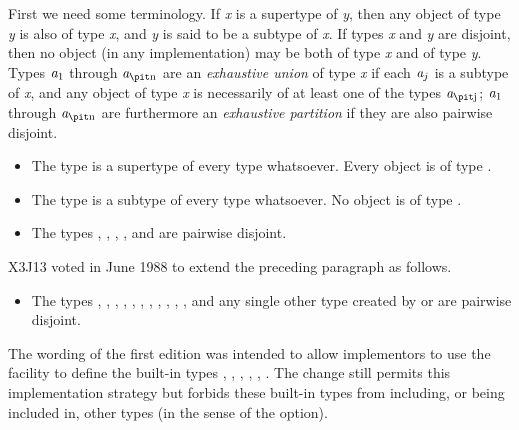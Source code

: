 First we need some terminology.
If \emph{x} is a supertype of \emph{y}, then any object of type \emph{y} is also
of type \emph{x}, and \emph{y} is said to be a subtype of \emph{x}.  If types
\emph{x} and \emph{y} are disjoint, then no object (in any implementation) may
be both of type \emph{x} and of type \emph{y}.  Types $\emph{a}_1$ through
$\emph{a}_{\hbox{\scriptsize\it n}}$ are an \emph{exhaustive union}
of type \emph{x} if each $\emph{a}_j$
is a subtype of \emph{x}, and any object of type \emph{x} is
necessarily of at least one of the types $\emph{a}_{\hbox{\scriptsize\it j}}$;
$\emph{a}_1$ through $\emph{a}_{\hbox{\scriptsize\it n}}$ are furthermore an \emph{exhaustive partition}
if they are also pairwise disjoint.

\begin{itemize}
\item
The type  is a supertype of every type whatsoever.
Every object is of type .

\item
The type {\nil} is a subtype of every type whatsoever.
No object is of type {\nil}.
\end{itemize}

\begin{obsolete}
\begin{itemize}
\item
The types , , , , and 
are pairwise disjoint.
\end{itemize}
\end{obsolete}

\begin{new}
X3J13 voted in June 1988
to extend the preceding paragraph as follows.

\begin{itemize}
\item
The types , , , , ,
, , , ,
, , and any single other type created by
 or 
are pairwise disjoint.
\end{itemize}

The wording of the first edition was intended to allow implementors to use
the  facility to define the built-in types ,
, , , , .
The change still permits this implementation strategy but
forbids these built-in types from including, or being included in,
other types (in the sense of the   option).
\end{new}

